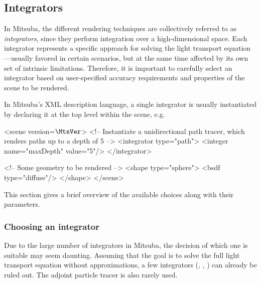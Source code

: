 \newpage
\subsection{Integrators}
\label{sec:integrators}
In Mitsuba, the different rendering techniques are collectively referred to as
\emph{integrators}, since they perform integration over a high-dimensional
space. Each integrator represents a specific approach for solving
the light transport equation---usually favored in certain scenarios, but
at the same time affected by its own set of intrinsic limitations.
Therefore, it is important to carefully select an integrator based on
user-specified accuracy requirements and properties of the scene to be
rendered.

In Mitsuba's XML description language, a single integrator
is usually instantiated by declaring it at the top level within the
scene, e.g.
\begin{xml}
<scene version=$\MtsVer$>
	<!-- Instantiate a unidirectional path tracer,
	     which renders paths up to a depth of 5 -->
	<integrator type="path">
		<integer name="maxDepth" value="5"/>
	</integrator>

	<!-- Some geometry to be rendered -->
	<shape type="sphere">
		<bsdf type="diffuse"/>
	</shape>
</scene>
\end{xml}

This section gives a brief overview of the available choices
along with their parameters.

\subsubsection*{Choosing an integrator}
Due to the large number of integrators in Mitsuba, the decision of which
one is suitable may seem daunting. Assuming that the goal is to solve
the full light transport equation without approximations, a few integrators
(, , )
can already be ruled out. The adjoint particle tracer  is
also rarely used.

